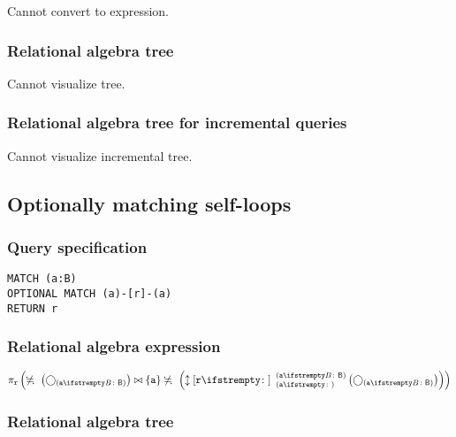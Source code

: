 Cannot convert to expression.

\subsubsection*{Relational algebra tree}

Cannot visualize tree.

\subsubsection*{Relational algebra tree for incremental queries}

Cannot visualize incremental tree.

\subsection{Optionally matching self-loops}

\subsubsection*{Query specification}

\begin{lstlisting}
MATCH (a:B)
OPTIONAL MATCH (a)-[r]-(a)
RETURN r
\end{lstlisting}

\subsubsection*{Relational algebra expression}

$\projection{\var{r}} \left(\alldifferent{} \left(\getvertices{a}{B}\right) \join \{\var{a}\} \alldifferent{} \left(\expandboth{r}{}{a}{a}{B} \left(\getvertices{a}{B}\right)\right)\right)$

\subsubsection*{Relational algebra tree}


